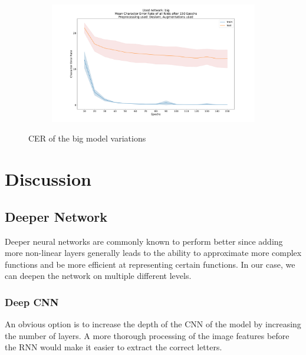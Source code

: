 \documentclass{article}
\begin{document}
\begin{figure}[H]
\begin{adjustwidth}{-8em}{-8em}
\begin{subfigure}{0.7\textwidth}
    \end{subfigure}
    \begin{subfigure}{0.7\textwidth}
        \centering
        \includegraphics[width=\textwidth]{Deslant_big_150_augmentations_cer}
    \end{subfigure}
    \end{adjustwidth}
\caption{CER of the big model variations}

\label{fig:CERBig}
\end{figure}

\newpage
\section{Discussion}
\subsection{Deeper Network}
Deeper neural networks are commonly known to perform better since adding more non-linear layers generally leads to the ability to approximate more complex functions and be more efficient at representing certain functions\cite{Bengio}\cite{LeRoux}\cite{Delalleau}\cite{Pascanu1}. In our case, we can deepen the network on multiple different levels.
\subsubsection{Deep CNN}
An obvious option is to increase the depth of the CNN of the model by increasing the number of layers. A more thorough processing of the image features before the RNN would make it easier to extract the correct letters.
\end{document}
